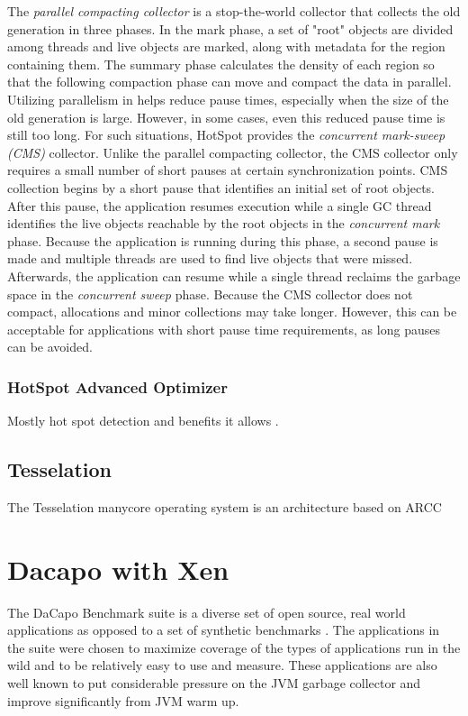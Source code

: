 \documentclass{sig-alternate}
\begin{document}
The \textit{parallel compacting collector} is a stop-the-world collector that collects the old generation in three phases. In the mark phase, a set of "root" objects are divided among threads and live objects are marked, along with metadata for the region containing them. The summary phase calculates the density of each region so that the following compaction phase can move and compact the data in parallel. Utilizing parallelism in helps reduce pause times, especially when the size of the old generation is large. However, in some cases, even this reduced pause time is still too long. For such situations, HotSpot provides the \textit{concurrent mark-sweep (CMS)} collector. Unlike the parallel compacting collector, the CMS collector only requires a small number of short pauses at certain synchronization points. CMS collection begins by a short pause that identifies an initial set of root objects. After this pause, the application resumes execution while a single GC thread identifies the live objects reachable by the root objects in the \textit{concurrent mark} phase. Because the application is running during this phase, a second pause is made and multiple threads are used to find live objects that were missed. Afterwards, the application can resume while a single thread reclaims the garbage space in the \textit{concurrent sweep} phase. Because the CMS collector does not compact, allocations and minor collections may take longer. However, this can be acceptable for applications with short pause time requirements, as long pauses can be avoided.




\subsubsection{HotSpot Advanced Optimizer}

Mostly hot spot detection and benefits it allows \cite{website:fermentas-lambda}.

\subsection{Tesselation}

The Tesselation manycore operating system is an architecture based on ARCC \cite{WinNT}

\section{Dacapo with Xen}
The DaCapo Benchmark suite is a diverse set of open source, real world applications as opposed to a set of synthetic benchmarks \cite{blackburn2006dacapo}. The applications in the suite were chosen to maximize coverage of the types of applications run in the wild and to be relatively easy to use and measure. These applications are also well known to put considerable pressure on the JVM garbage collector and improve significantly from JVM warm up. 
\end{document}
